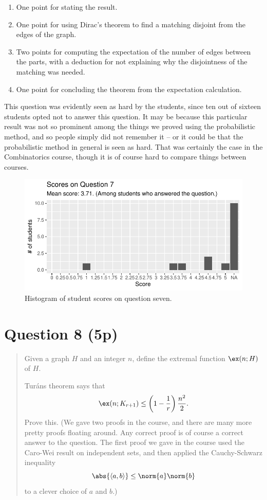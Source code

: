 \documentclass[nobib]{tufte-handout}
\begin{document}
\begin{enumerate}
  \item One point for stating the result.
  \item One point for using Dirac's theorem to find a matching disjoint from the edges of the graph.
  \item Two points for computing the expectation of the number of edges between the parts, with a deduction for not explaining why the disjointness of the matching was needed.
  \item One point for concluding the theorem from the expectation calculation.
\end{enumerate}

This question was evidently seen as hard by the students, since ten out of sixteen students opted not to answer this question. It may be because this particular result was not so prominent among the things we proved using the probabilistic method, and so people simply did not remember it -- or it could be that the probabilistic method in general is seen as hard. That was certainly the case in the Combinatorics course, though it is of course hard to compare things between courses.

\begin{figure}[p]
  \centering
  \includegraphics[width = \textwidth]{Q7.pdf}
  \caption[Score histogram for Q7]{Histogram of student scores on question seven.}
  \label{fig:Q7}
\end{figure}

\section{Question 8 (5p)} %

\begin{quotation}
  Given a graph $H$ and an integer $n$, define the extremal function $\ex(n; H)$ of $H$.

  Turáns theorem says that
  $$\ex(n; K_{r+1}) \leq \left(1 - \frac{1}{r}\right)\frac{n^2}{2}.$$
  Prove this. (We gave two proofs in the course, and there are many more pretty proofs floating around. Any correct proof is of course a correct answer to the question. The first proof we gave in the course used the Caro-Wei result on independent sets, and then applied the Cauchy-Schwarz inequality
  $$\abs{\langle a, b \rangle} \leq \norm{a}\norm{b}$$
  to a clever choice of $a$ and $b$.)
\end{quotation}
\end{document}
